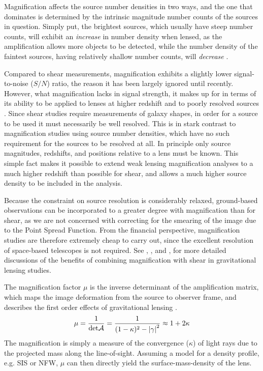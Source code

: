 Magnification affects the source number densities in two ways, and the one that dominates is determined by the intrinsic magnitude number counts of the sources in question.  Simply put, the brightest sources, which usually have steep number counts, will exhibit an {\it increase} in number density when lensed, as the amplification allows more objects to be detected, while the number density of the faintest sources, having relatively shallow number counts, will {\it decrease} \citep{Narayan89}.

Compared to shear measurements, magnification exhibits a slightly lower signal-to-noise ($S/N$) ratio, the reason it has been largely ignored until recently.  However, what magnification lacks in signal strength, it makes up for in terms of its ability to be applied to lenses at higher redshift and to poorly resolved sources \citep{Waerbeke10}.  Since shear studies require measurements of galaxy shapes, in order for a source to be used it must necessarily be well resolved.  This is in stark contrast to magnification studies using source number densities, which have no such requirement for the sources to be resolved at all.  In principle only source magnitudes, redshifts, and positions relative to a lens must be known.  This simple fact makes it possible to extend weak lensing magnification analyses to a much higher redshift than possible for shear, and allows a much higher source density to be included in the analysis.  

Because the constraint on source resolution is considerably relaxed, ground-based observations can be incorporated to a greater degree with magnification than for shear, as we are not concerned with correcting for the smearing of the image due to the Point Spread Function. From the financial perspective, magnification studies are therefore extremely cheap to carry out, since the excellent resolution of space-based telescopes is not required. See \citet{Waerbeke10}, \citet{RozoSchmidt10}, and \citet{Umetsu11}, for more detailed discussions of the benefits of combining magnification with shear in gravitational lensing studies.

The magnification factor $\mu$ is the inverse determinant of the amplification matrix, which maps the image deformation from the source to observer frame, and describes the first order effects of gravitational lensing \citep{BS01}.
\begin{equation}
\mu = \frac{1}{\mathrm{det} \cal{A}} = 
\frac{1}{(1-\kappa)^2 - \left|\gamma\right|^2} \approx 1+2\kappa
\label{mu}
\end{equation}
The magnification is simply a measure of the convergence ($\kappa$) of light rays due to the projected mass along the line-of-sight.  Assuming a model for a density profile, e.g. SIS or NFW, $\mu$ can then directly yield the surface-mass-density of the lens.

